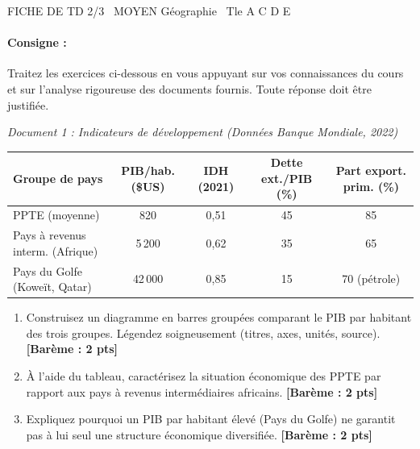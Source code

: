 \documentclass[11pt]{article}
\begin{document}
\begin{tcolorbox}[enhanced,colback=popink,colframe=popink,arc=10pt,boxrule=0pt,left=12pt,right=12pt,top=9pt,bottom=9pt]
{\color{white}\popxbold\small FICHE DE TD 2/3 \textbullet\ MOYEN \hfill Géographie \textbullet\ Tle A C D E\par}
\end{tcolorbox}
\vspace{4pt}
\paragraph{Consigne :} Traitez les exercices ci-dessous en vous appuyant sur vos connaissances du cours et sur l'analyse rigoureuse des documents fournis. Toute réponse doit être justifiée.

\begin{exercice}
\emph{Document 1 : Indicateurs de développement (Données Banque Mondiale, 2022)}

\begin{tabular}{lcccc}
\toprule
\textbf{Groupe de pays} & \textbf{PIB/hab. (\$US)} & \textbf{IDH (2021)} & \textbf{Dette ext./PIB (\%)} & \textbf{Part export. prim. (\%)} \\
\midrule
PPTE (moyenne) & 820 & 0,51 & 45 & 85 \\
Pays à revenus interm. (Afrique) & 5\,200 & 0,62 & 35 & 65 \\
Pays du Golfe (Koweït, Qatar) & 42\,000 & 0,85 & 15 & 70 (pétrole) \\
\bottomrule
\end{tabular}

\begin{enumerate}
    \item Construisez un diagramme en barres groupées comparant le PIB par habitant des trois groupes. Légendez soigneusement (titres, axes, unités, source). \textbf{[Barème : 2 pts]}
    \item À l'aide du tableau, caractérisez la situation économique des PPTE par rapport aux pays à revenus intermédiaires africains. \textbf{[Barème : 2 pts]}
    \item Expliquez pourquoi un PIB par habitant élevé (Pays du Golfe) ne garantit pas à lui seul une structure économique diversifiée. \textbf{[Barème : 2 pts]}
\end{enumerate}
\end{exercice}
\end{document}
